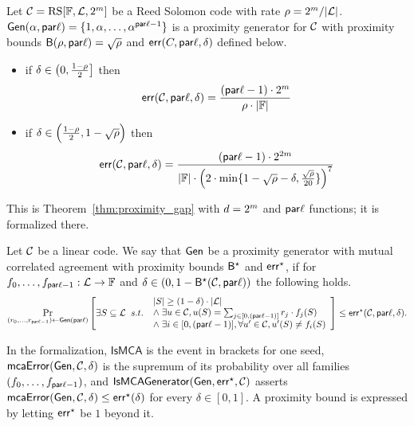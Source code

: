 \begin{theorem}\label{thm:proximity_gap_whir}
    Let $\mathcal{C} = \mathrm{RS}[\mathbb{F},\mathcal{L},2^m]$ be a Reed Solomon code with rate $\rho = 2^m/|\mathcal{L}|$. $\mathsf{Gen}(\alpha,\mathsf{par}\ell)=\{1,\alpha,\ldots,\alpha^{\mathsf{par}\ell-1}\}$ is a proximity generator for $\mathcal{C}$ with proximity bounds ${\mathsf{B}}(\rho,\mathsf{par}\ell)=\sqrt{\rho}$ and $\mathsf{err}(C,\mathsf{par}\ell,\delta)$ defined below.
    \begin{itemize}
        \item if $\delta \in \left(0,\frac{1-\rho}{2}\right]$ then
            \[
                \mathsf{err}(\mathcal{C},\mathsf{par}\ell,\delta)=\frac{(\mathsf{par}\ell-1)\cdot 2^m}{\rho\cdot|\mathbb{F}|}
            \]
        \item if $\delta \in \Bigl(\frac{1-\rho}{2}, 1-\sqrt{\rho}\Bigr)$ then
        \[
            \mathsf{err}(\mathcal{C},\mathsf{par}\ell,\delta)=\frac{(\mathsf{par}\ell-1)\cdot 2^{2m}}{|\mathbb{F}|\cdot{\Bigl(2\cdot\min\{1-\sqrt{\rho}-\delta,\frac{\sqrt{\rho}}{20}\}\Bigr)}^7}
        \]
    \end{itemize}
    This is Theorem~\ref{thm:proximity_gap} with $d=2^m$ and $\mathsf{par}\ell$ functions; it is
    formalized there.
\end{theorem}

\begin{definition}\label{def:gen_mutual_corr_agreement}
\leanok
    Let $\mathcal{C}$ be a linear code. We say that $\mathsf{Gen}$ be a proximity generator with mutual correlated agreement with proximity bounds ${\mathsf{B}}^\star$ and $\mathsf{err}^\star$, if for $f_0,\ldots,f_{\mathsf{par}\ell-1}:\mathcal{L}\rightarrow\mathbb{F}$ and $\delta\in(0,1-{\mathsf{B}}^\star(\mathcal{C},\mathsf{par}\ell))$ the following holds.
    \[
    \Pr_{(r_0, \ldots, r_{\mathsf{par}\ell-1}) \leftarrow \mathsf{Gen}(\mathsf{par}\ell)} \left[
        \exists S \subseteq \mathcal{L} \;\; s.t.\;\;
        \begin{array}{l}
        |S| \geq (1 - \delta) \cdot |\mathcal{L}| \\
        \land\; \exists u \in \mathcal{C}, u(S) = \sum_{j \in [0,(\mathsf{par}\ell-1)]} r_j \cdot f_j(S) \\
        \land\; \exists i \in [0,(\mathsf{par}\ell-1)], \forall u' \in \mathcal{C}, u'(S) \neq f_i(S)
        \end{array}\right]
    \leq \mathsf{err}^\star(\mathcal{C}, \mathsf{par}\ell, \delta).
    \]

    In the formalization, $\mathsf{IsMCA}$ is the event in brackets for one seed,
    $\mathsf{mcaError}(\mathsf{Gen},\mathcal{C},\delta)$ is the supremum of its probability over all families
    $(f_0,\ldots,f_{\mathsf{par}\ell-1})$, and $\mathsf{IsMCAGenerator}(\mathsf{Gen},\mathsf{err}^\star,\mathcal{C})$ asserts
    $\mathsf{mcaError}(\mathsf{Gen},\mathcal{C},\delta)\le\mathsf{err}^\star(\delta)$ for every $\delta\in[0,1]$.
    A proximity bound is expressed by letting $\mathsf{err}^\star$ be $1$ beyond it.
\end{definition}

